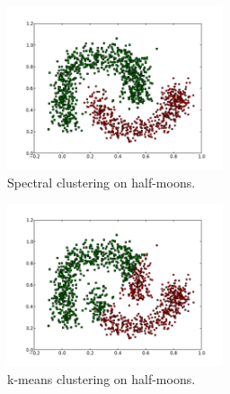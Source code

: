 \documentclass[conference]{IEEEtran}
\begin{document}
\begin{figure}[th]
\centering
\includegraphics[width=15pc]{spectral_half-moons.pdf}
\caption{Spectral clustering on half-moons.}
\label{spectral_halfmoons}
\end{figure}

\begin{figure}[th]
\centering
\includegraphics[width=15pc]{kmeans_half-moons.pdf}
\caption{k-means clustering on half-moons.}
\label{kmeans_halfmoons}
\end{figure}
\end{document}
